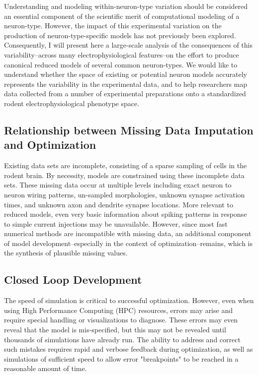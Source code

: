 Understanding and modeling within-neuron-type variation should be considered an essential component of the scientific merit of computational modeling of a neuron-type.
However, the impact of this experimental variation on the production of neuron-type-specific models has not previously been explored.
Consequently, I will present here a large-scale analysis of the consequences of this variability--across many electrophysiological features--on the effort to produce canonical reduced models of several common neuron-types.
We would like to understand whether the space of existing or potential neuron models accurately represents the variability in the experimental data, and to help researchers map data collected from a number of experimental preparations onto a standardized rodent electrophysiological phenotype space.

\subsection{Relationship between Missing Data Imputation and Optimization}
Existing data sets are incomplete, consisting of a sparse sampling of cells in the rodent brain. By necessity, models are constrained using these incomplete data sets.
These missing data occur at multiple levels including exact neuron to neuron wiring patterns, un-sampled morphologies, unknown synapse activation times, and unknown axon and dendrite synapse locations.
More relevant to reduced models, even very basic information about spiking patterns in response to simple current injections may be unavailable.
However, since most fast numerical methods are incompatible with missing data, an additional component of model development--especially in the context of optimization--remains, which is the synthesis of plausible missing values.

\subsection{Closed Loop Development}
The speed of simulation is critical to successful optimization. However, even when using High Performance Computing (HPC) resources, errors may arise and require special handling or visualizations to diagnose.  These errors may even reveal that the model is mis-specified, but this may not be revealed until thousands of simulations have already run.
The ability to address and correct such mistakes requires rapid and verbose feedback during optimization, as well as simulations of sufficient speed to allow error "breakpoints" to be reached in a reasonable amount of time.

